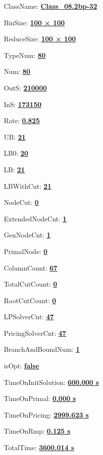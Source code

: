 \documentclass[11pt]{article}
\begin{document}
\pagestyle{empty}


ClassName: \underline{\textbf{Class_08.2bp-32}}
\par
BinSize: \underline{\textbf{100 × 100}}
\par
ReduceSize: \underline{\textbf{100 × 100}}
\par
TypeNum: \underline{\textbf{80}}
\par
Num: \underline{\textbf{80}}
\par
OutS: \underline{\textbf{210000}}
\par
InS: \underline{\textbf{173150}}
\par
Rate: \underline{\textbf{0.825}}
\par
UB: \underline{\textbf{21}}
\par
LB0: \underline{\textbf{20}}
\par
LB: \underline{\textbf{21}}
\par
LBWithCut: \underline{\textbf{21}}
\par
NodeCut: \underline{\textbf{0}}
\par
ExtendedNodeCnt: \underline{\textbf{1}}
\par
GenNodeCnt: \underline{\textbf{1}}
\par
PrimalNode: \underline{\textbf{0}}
\par
ColumnCount: \underline{\textbf{67}}
\par
TotalCutCount: \underline{\textbf{0}}
\par
RootCutCount: \underline{\textbf{0}}
\par
LPSolverCnt: \underline{\textbf{47}}
\par
PricingSolverCnt: \underline{\textbf{47}}
\par
BranchAndBoundNum: \underline{\textbf{1}}
\par
isOpt: \underline{\textbf{false}}
\par
TimeOnInitSolution: \underline{\textbf{600.000 s}}
\par
TimeOnPrimal: \underline{\textbf{0.000 s}}
\par
TimeOnPricing: \underline{\textbf{2999.623 s}}
\par
TimeOnRmp: \underline{\textbf{0.125 s}}
\par
TotalTime: \underline{\textbf{3600.014 s}}
\par
\newpage


\end{document}
